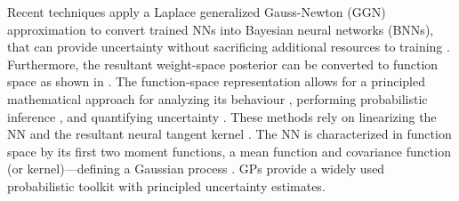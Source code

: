\documentclass{article}
\makeatletter
\newcommand{\eg}{\textit{e.g.\@}\xspace}
\newcommand{\our}{\textsc{sfr}\xspace}
\makeatother
\begin{document}
\begin{figure}[t!]
  \vspace*{-1em}
\end{figure}


Recent techniques  \citep[\eg,][]{ritter2018kfac,khan2019approximate,daxberger2021laplace,fortuin2021bayesian,immer2021scalable} apply a Laplace
generalized Gauss-Newton (GGN) approximation to convert trained NNs into Bayesian neural networks (BNNs), that can provide uncertainty without sacrificing additional resources to training \citep{foong2019between}. Furthermore, the resultant weight-space posterior can be converted to function space as shown in \citet{khan2019approximate, immer2021improving}. The function-space representation allows for a principled mathematical approach for analyzing its behaviour \citep{cho2009kernel,meronen2020stationary}, performing probabilistic inference \citep{khan2019approximate}, and quantifying uncertainty \citep{foong2019between}. These methods rely on linearizing the NN and the resultant neural tangent kernel \citep[NTK,][]{jacot2018neural}.
The NN is characterized in function space by its first two moment functions, a mean function and covariance function (or kernel)---defining a Gaussian process \citep[GP,][]{rasmussen2006gaussian}. GPs provide a widely used probabilistic toolkit with principled uncertainty estimates.
\end{document}
